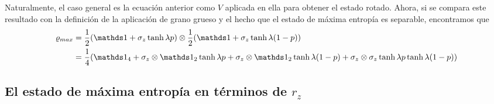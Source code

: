 Naturalmente, el caso general es la ecuación anterior como $V$ aplicada en ella para obtener el estado rotado. Ahora, si se compara este resultado con la definición de la aplicación de grano grueso y el hecho que el estado de máxima entropía es separable, encontramos que
\begin{align*}
  \varrho_{max}&=\frac{1}{2}(\Id+\sigma_{z}\tanh{\lambda p})\otimes\frac{1}{2}(\Id+\sigma_{z}\tanh{\lambda (1-p)})\\
  &  =\frac{1}{4}(\Id_{4}+\sigma_{z}\otimes\Id_{2}\tanh{\lambda p}+\sigma_{z}\otimes \Id_{2}\tanh{\lambda (1-p)}+\sigma_{z}\otimes \sigma_{z}\tanh{\lambda p}\tanh{\lambda (1-p)})
\end{align*}

\subsection{El estado de máxima entropía en términos de $r_{z}$}

